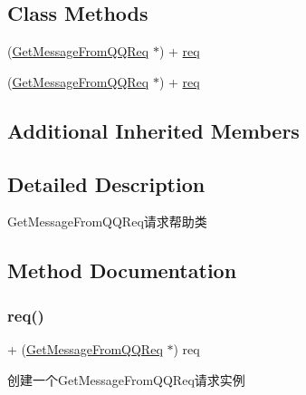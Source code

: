 \subsection*{Class Methods}
\begin{DoxyCompactItemize}
\item 
(\mbox{\hyperlink{interface_get_message_from_q_q_req}{Get\+Message\+From\+Q\+Q\+Req}} $\ast$) + \mbox{\hyperlink{interface_get_message_from_q_q_req_accdb278a9eb8b469aeb098c5046d266c}{req}}
\item 
(\mbox{\hyperlink{interface_get_message_from_q_q_req}{Get\+Message\+From\+Q\+Q\+Req}} $\ast$) + \mbox{\hyperlink{interface_get_message_from_q_q_req_accdb278a9eb8b469aeb098c5046d266c}{req}}
\end{DoxyCompactItemize}
\subsection*{Additional Inherited Members}


\subsection{Detailed Description}
Get\+Message\+From\+Q\+Q\+Req请求帮助类 

\subsection{Method Documentation}
\mbox{\label{interface_get_message_from_q_q_req_accdb278a9eb8b469aeb098c5046d266c}} 
\subsubsection{\texorpdfstring{req()}{req()}\hspace{0.1cm}{\footnotesize\ttfamily [1/2]}}
{\footnotesize\ttfamily + (\mbox{\hyperlink{interface_get_message_from_q_q_req}{Get\+Message\+From\+Q\+Q\+Req}} $\ast$) req \begin{DoxyParamCaption}{ }\end{DoxyParamCaption}}

创建一个\+Get\+Message\+From\+Q\+Q\+Req请求实例 \mbox{\label{interface_get_message_from_q_q_req_accdb278a9eb8b469aeb098c5046d266c}} 
